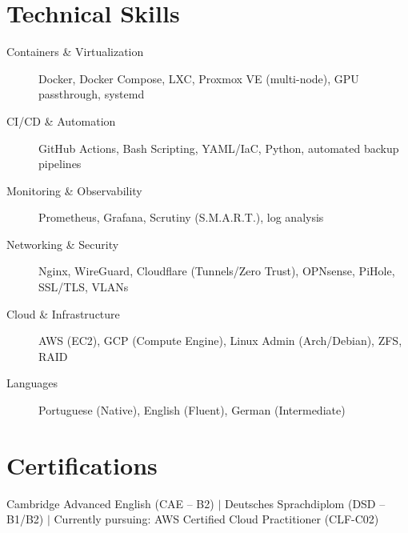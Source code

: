 \documentclass[10pt]{article}
\begin{document}
\section{Technical Skills}
\begin{description}
	\item[Containers \& Virtualization] Docker, Docker Compose, LXC, Proxmox VE (multi-node), GPU passthrough, systemd
	\item[CI/CD \& Automation] GitHub Actions, Bash Scripting, YAML/IaC, Python, automated backup pipelines
	\item[Monitoring \& Observability] Prometheus, Grafana, Scrutiny (S.M.A.R.T.), log analysis
	\item[Networking \& Security] Nginx, WireGuard, Cloudflare (Tunnels/Zero Trust), OPNsense, PiHole, SSL/TLS, VLANs
	\item[Cloud \& Infrastructure] AWS (EC2), GCP (Compute Engine), Linux Admin (Arch/Debian), ZFS, RAID
	\item[Languages] Portuguese (Native), English (Fluent), German (Intermediate)
\end{description}

\section{Certifications}
Cambridge Advanced English (CAE -- B2) $|$ Deutsches Sprachdiplom (DSD -- B1/B2) $|$ Currently pursuing: AWS Certified Cloud Practitioner (CLF-C02)
\end{document}
